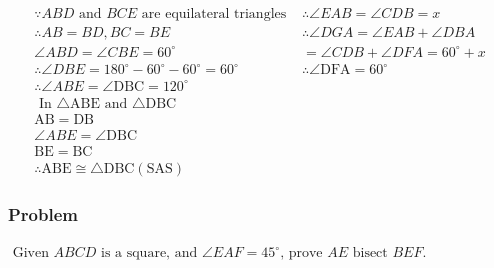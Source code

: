\documentclass{article}
\begin{document}
$$\begin{array}{ll}
\because A B D \text { and } B C E \text { are equilateral triangles } & \therefore \angle E A B=\angle C D B=x \\
\therefore A B=B D, B C=B E & \therefore \angle D G A=\angle E A B+\angle D B A \\
\angle A B D=\angle C B E=60^{\circ} & =\angle C D B+\angle D F A=60^{\circ}+x \\
\therefore \angle D B E=180^{\circ}-60^{\circ}-60^{\circ}=60^{\circ} & \therefore \angle \mathrm{DFA}=60^{\circ} \\
\therefore \angle A B E=\angle \mathrm{DBC}=120^{\circ} & \\
\text { In } \triangle \mathrm{ABE} \text { and } \triangle \mathrm{DBC} & \\
\mathrm{AB}=\mathrm{DB} & \\
\angle A B E=\angle \mathrm{DBC} & \\
\mathrm{BE}=\mathrm{BC} & \\ 
\therefore \mathrm{ABE} \cong \triangle \mathrm{DBC}(\mathrm{SAS}) &
\end{array}$$
\pagebreak
\subsubsection{Problem}
$\text { Given } ABCD \text { is a square, and } \angle EAF=45^{\circ} \text {, prove } AE \text { bisect } BEF \text {. }$


\end{document}
